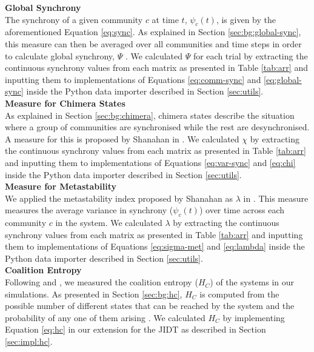 \documentclass[a4paper,11pt]{article}
\begin{document}
\noindent \textbf{Global Synchrony}\\
\noindent The synchrony of a given community $c$ at time $t$, $\psi_c(t)$, is given by the aforementioned Equation \ref{eq:sync}. As explained in Section \ref{sec:bg:global-sync}, this measure can then be averaged over all communities and time steps in order to calculate global synchrony, $\Psi$ \cite{Shanahan2010}. We calculated $\Psi$ for each trial by extracting the continuous synchrony values from each matrix as presented in Table \ref{tab:arr} and inputting them to implementations of Equations \ref{eq:comm-sync} and \ref{eq:global-sync} inside the Python data importer described in Section \ref{sec:utils}.\\

\noindent \textbf{Measure for Chimera States}\\
\noindent As explained in Section \ref{sec:bg:chimera}, chimera states describe the situation where a group of communities are synchronised while the rest are desynchronised. A measure for this is proposed by Shanahan in \cite{Shanahan2010}. We calculated $\chi$ by extracting the continuous synchrony values from each matrix as presented in Table \ref{tab:arr} and inputting them to implementations of Equations \ref{eq:var-sync} and \ref{eq:chi} inside the Python data importer described in Section \ref{sec:utils}.\\

\noindent \textbf{Measure for Metastability}\\
\noindent We applied the metastability index proposed by Shanahan as $\lambda$ in \cite{Shanahan2010}. This measure measures the average variance in synchrony ($\psi_c(t)$) over time across each community $c$ in the system. We calculated $\lambda$ by extracting the continuous synchrony values from each matrix as presented in Table \ref{tab:arr} and inputting them to implementations of Equations \ref{eq:sigma-met} and \ref{eq:lambda} inside the Python data importer described in Section \ref{sec:utils}.\\

\noindent \textbf{Coalition Entropy}\\
\noindent Following \cite{Shanahan2010} and \cite{Bhowmik2013}, we measured the coalition entropy ($H_C$) of the systems in our simulations. As presented in Section \ref{sec:bg:hc}, $H_C$ is computed from the possible number of different states that can be reached by the system and the probability of any one of them arising \cite{Bhowmik2013}. We calculated $H_{C}$ by implementing Equation \ref{eq:hc} in our extension for the JIDT as described in Section \ref{sec:impl:hc}.\\
\end{document}
